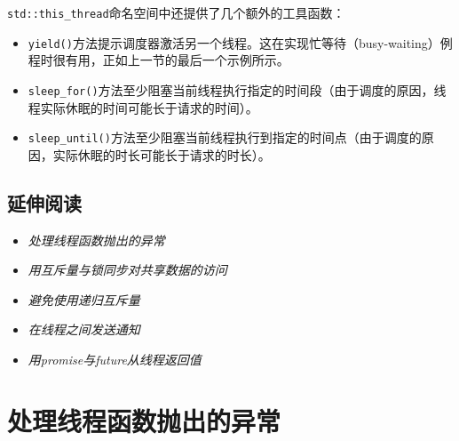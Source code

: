 
\texttt{std::\allowbreak{}this\_\allowbreak{}thread}命名空间中还提供了几个额外的工具函数：



\begin{itemize}
\item \texttt{yield()}方法提示调度器激活另一个线程。这在实现忙等待（busy-waiting）例程时很有用，正如上一节的最后一个示例所示。



\item \texttt{sleep\_\allowbreak{}for()}方法至少阻塞当前线程执行指定的时间段（由于调度的原因，线程实际休眠的时间可能长于请求的时间）。



\item \texttt{sleep\_\allowbreak{}until()}方法至少阻塞当前线程执行到指定的时间点（由于调度的原因，实际休眠的时长可能长于请求的时长）。


\end{itemize}



\subsection{延伸阅读}



\begin{itemize}
\item \textit{处理线程函数抛出的异常}



\item \textit{用互斥量与锁同步对共享数据的访问}



\item \textit{避免使用递归互斥量}



\item \textit{在线程之间发送通知}



\item \textit{用promise与future从线程返回值}


\end{itemize}



\section{处理线程函数抛出的异常}


